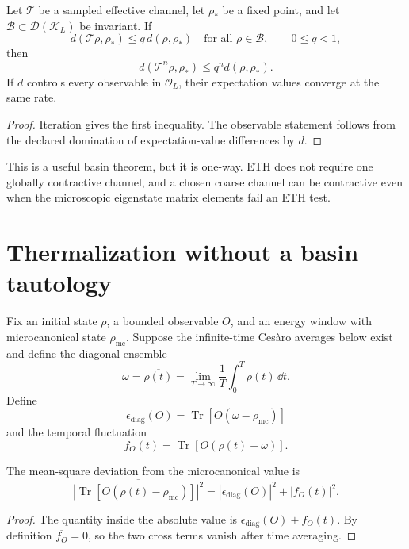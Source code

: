 \documentclass[11pt]{article}
\DeclareMathOperator{\Tr}{Tr}
\newcommand{\Dens}{\mathcal D}
\newcommand{\Obs}{\mathcal O}
\newcommand{\Eff}{\mathcal K}
\newcommand{\TT}{\mathcal T}
\newcommand{\rhoMC}{\rho_{\mathrm{mc}}}
\begin{document}
\begin{theorem}\label{thm:contraction}
Let $\TT$ be a sampled effective channel, let $\rho_\ast$ be a fixed
point, and let $\mathcal B\subset\Dens(\Eff_L)$ be invariant.  If
\[
 d(\TT\rho,\rho_\ast)\leq q\,d(\rho,\rho_\ast)
 \quad\text{for all }\rho\in\mathcal B,\qquad 0\leq q<1,
\]
then
\[
 d(\TT^n\rho,\rho_\ast)\leq q^n d(\rho,\rho_\ast).
\]
If $d$ controls every observable in $\Obs_L$, their expectation values
converge at the same rate.
\end{theorem}

\begin{proof}
Iteration gives the first inequality.  The observable statement follows
from the declared domination of expectation-value differences by $d$.
\end{proof}

This is a useful basin theorem, but it is one-way.  ETH does not require
one globally contractive channel, and a chosen coarse channel can be
contractive even when the microscopic eigenstate matrix elements fail an
ETH test.

\section{Thermalization without a basin tautology}

Fix an initial state $\rho$, a bounded observable $O$, and an energy
window with microcanonical state $\rhoMC$.  Suppose the infinite-time
Ces\`aro averages below exist and define the diagonal ensemble
\[
 \omega=\overline{\rho(t)}
 =\lim_{T\to\infty}\frac1T\int_0^T\rho(t)\,\dd t.
\]
Define
\[
 \epsilon_{\mathrm{diag}}(O)
 =\Tr[O(\omega-\rhoMC)]
\]
and the temporal fluctuation
\[
 f_O(t)=\Tr[O(\rho(t)-\omega)].
\]

\begin{theorem}\label{thm:decomposition}
The mean-square deviation from the microcanonical value is
\begin{equation}\label{eq:decomposition}
 \overline{\left|\Tr[O(\rho(t)-\rhoMC)]\right|^2}
 =
 |\epsilon_{\mathrm{diag}}(O)|^2+
 \overline{|f_O(t)|^2}.
\end{equation}
\end{theorem}

\begin{proof}
The quantity inside the absolute value is
$\epsilon_{\mathrm{diag}}(O)+f_O(t)$.  By definition
$\overline{f_O}=0$, so the two cross terms vanish after time averaging.
\end{proof}
\end{document}
